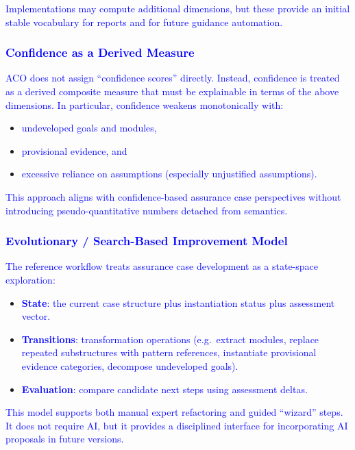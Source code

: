 \documentclass[11pt,twoside,a4paper]{article}
\begin{document}
\textcolor{blue}{Implementations may compute additional dimensions, but these provide an initial stable vocabulary for reports and for future guidance automation.}

\subsubsection{\textcolor{blue}{Confidence as a Derived Measure}}

\textcolor{blue}{ACO does not assign ``confidence scores'' directly. Instead, confidence is treated as a derived composite measure that must be explainable in terms of the above dimensions. In particular, confidence weakens monotonically with:}
\begin{itemize}[leftmargin=2em]
  \item \textcolor{blue}{undeveloped goals and modules,}
  \item \textcolor{blue}{provisional evidence, and}
  \item \textcolor{blue}{excessive reliance on assumptions (especially unjustified assumptions).}
\end{itemize}

\textcolor{blue}{This approach aligns with confidence-based assurance case perspectives without introducing pseudo-quantitative numbers detached from semantics.}

\subsubsection{\textcolor{blue}{Evolutionary / Search-Based Improvement Model}}

\textcolor{blue}{The reference workflow treats assurance case development as a state-space exploration:}
\begin{itemize}[leftmargin=2em]
  \item \textcolor{blue}{\textbf{State}: the current case structure plus instantiation status plus assessment vector.}
  \item \textcolor{blue}{\textbf{Transitions}: transformation operations (e.g.\ extract modules, replace repeated substructures with pattern references, instantiate provisional evidence categories, decompose undeveloped goals).}
  \item \textcolor{blue}{\textbf{Evaluation}: compare candidate next steps using assessment deltas.}
\end{itemize}

\textcolor{blue}{This model supports both manual expert refactoring and guided ``wizard'' steps. It does not require AI, but it provides a disciplined interface for incorporating AI proposals in future versions.}
\end{document}
